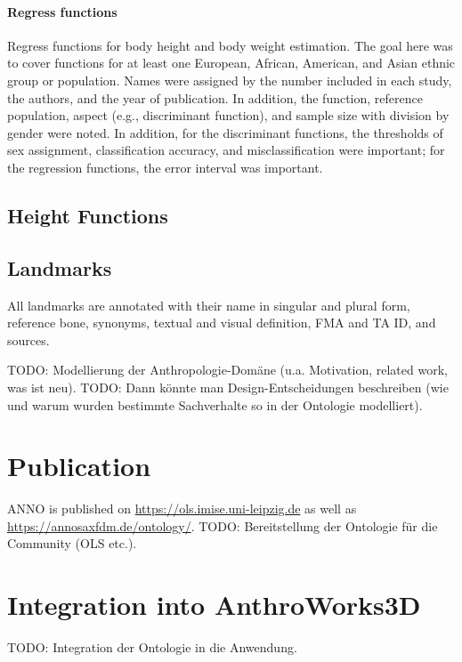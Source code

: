 \documentclass[sw]{iosart2x}
\newcommand{\aw}{AnthroWorks3D}
\begin{document}
\paragraph{Regress functions}
Regress functions for body height and body weight estimation. The goal here was to cover functions for at least one European, African, American, and Asian ethnic group or population. Names were assigned by the number included in each study, the authors, and the year of publication. In addition, the function, reference population, aspect (e.g., discriminant function), and sample size with division by gender were noted. In addition, for the discriminant functions, the thresholds of sex assignment, classification accuracy, and misclassification were important; for the regression functions, the error interval was important.

\subsection{Height Functions}
\subsection{Landmarks}
All landmarks are annotated with their name in singular and plural form, reference bone, synonyms, textual and visual definition, FMA and TA ID, and sources.

TODO: Modellierung der Anthropologie-Domäne (u.a. Motivation, related work, was ist neu).
TODO: Dann könnte man Design-Entscheidungen beschreiben (wie und warum wurden bestimmte Sachverhalte so in der Ontologie modelliert).
\section{Publication}
ANNO is published on \url{https://ols.imise.uni-leipzig.de} as well as \url{https://annosaxfdm.de/ontology/}.
TODO: Bereitstellung der Ontologie für die Community (OLS etc.). 
\section{Integration into \aw{}}
TODO: Integration der Ontologie in die Anwendung.
\end{document}
